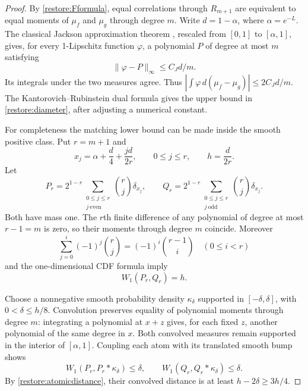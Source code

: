 \documentclass[11pt]{article}
\theoremstyle{definition}
\theoremstyle{remark}
\numberwithin{equation}{section}
\begin{document}
\begin{proof}
By \eqref{restore:Fformula}, equal correlations through $R_{m+1}$ are
equivalent to equal moments of $\mu_f$ and $\mu_g$ through degree $m$.
Write $d=1-\alpha$, where $\alpha=e^{-L}$.  The classical Jackson
approximation theorem \cite{DL}, rescaled from $[0,1]$
to $[\alpha,1]$, gives, for every 1-Lipschitz function $\varphi$, a
polynomial $P$ of degree at most $m$ satisfying
\[
                 \|\varphi-P\|_\infty\le C_Jd/m.
\]
Its integrals under the two measures agree.  Thus
$|\int\varphi\,d(\mu_f-\mu_g)|\le2C_Jd/m$.  The
Kantorovich--Rubinstein dual formula gives the upper bound in
\eqref{restore:diameter}, after adjusting a numerical constant.

For completeness the matching lower bound can be made inside the smooth
positive class.  Put $r=m+1$ and
\[
 x_j=\alpha+\frac d4+\frac{jd}{2r},\qquad 0\le j\le r,
 \qquad h=\frac d{2r}.
\]
Let
\[
 P_r=2^{1-r}\sum_{\substack{0\le j\le r\\j\ {\mathrm{even}}}}
                        \binom rj\delta_{x_j},\qquad
 Q_r=2^{1-r}\sum_{\substack{0\le j\le r\\j\ {\mathrm{odd}}}}
                        \binom rj\delta_{x_j}.
\]
Both have mass one.  The $r$th finite difference of any polynomial of
degree at most $r-1=m$ is zero, so their moments through degree $m$
coincide.  Moreover
\[
 \sum_{j=0}^i(-1)^j\binom rj=(-1)^i\binom{r-1}{i}
                           \quad(0\le i<r)
\]
and the one-dimensional CDF formula imply
\begin{equation}\label{restore:atomicdistance}
                      W_1(P_r,Q_r)=h.
\end{equation}

Choose a nonnegative smooth probability density $\kappa_\delta$ supported
in $[-\delta,\delta]$, with $0<\delta\le h/8$.  Convolution preserves
equality of polynomial moments through degree $m$: integrating a
polynomial at $x+z$ gives, for each fixed $z$, another polynomial of
the same degree in $x$.  Both convolved measures remain supported in
the interior of $[\alpha,1]$.  Coupling each atom with its translated
smooth bump shows
\[
 W_1(P_r,P_r*\kappa_\delta)\le\delta,
 \qquad W_1(Q_r,Q_r*\kappa_\delta)\le\delta.
\]
By \eqref{restore:atomicdistance}, their convolved distance is at least
$h-2\delta\ge3h/4$.


\end{proof}
\end{document}

